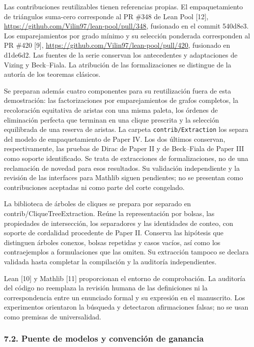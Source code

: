 \documentclass[spanish,11pt,a4paper]{article}
\begin{document}
Las contribuciones reutilizables tienen referencias propias. El empaquetamiento de triángulos suma-cero corresponde al PR \#348 de Lean Pool {[}12{]}, \url{https://github.com/Vilin97/lean-pool/pull/348}, fusionado en el commit {\ttfamily\small 540d8e3}. Los emparejamientos por grado mínimo y su selección ponderada corresponden al PR \#420 {[}9{]}, \url{https://github.com/Vilin97/lean-pool/pull/420}, fusionado en {\ttfamily\small d1de6d2}. Las fuentes de la serie conservan los antecedentes y adaptaciones de Vizing y Beck--Fiala. La atribución de las formalizaciones se distingue de la autoría de los teoremas clásicos.

Se preparan además cuatro componentes para su reutilización fuera de esta demostración: las factorizaciones por emparejamientos de grafos completos, la recoloración equitativa de aristas con una misma paleta, los órdenes de eliminación perfecta que terminan en una clique prescrita y la selección equilibrada de una reserva de aristas. La carpeta \nolinkurl{contrib/Extraction} los separa del modelo de empaquetamiento de Paper IV. Los dos últimos conservan, respectivamente, las pruebas de Dirac de Paper II y de Beck--Fiala de Paper III como soporte identificado. Se trata de extracciones de formalizaciones, no de una reclamación de novedad para esos resultados. Su validación independiente y la revisión de las interfaces para Mathlib siguen pendientes; no se presentan como contribuciones aceptadas ni como parte del corte congelado.

La biblioteca de árboles de cliques se prepara por separado en \mbox{contrib/}\allowbreak\mbox{CliqueTreeExtraction}. Reúne la representación por bolsas, las propiedades de intersección, los separadores y las identidades de conteo, con soporte de cordalidad procedente de Paper II. Conserva las hipótesis que distinguen árboles conexos, bolsas repetidas y casos vacíos, así como los contraejemplos a formulaciones que las omiten. Su extracción tampoco se declara validada hasta completar la compilación y la auditoría independientes.

Lean {[}10{]} y Mathlib {[}11{]} proporcionan el entorno de comprobación. La auditoría del código no reemplaza la revisión humana de las definiciones ni la correspondencia entre un enunciado formal y su expresión en el manuscrito. Los experimentos orientaron la búsqueda y detectaron afirmaciones falsas; no se usan como premisas de universalidad.

\subsubsection{7.2. Puente de modelos y convención de ganancia}\label{puente-de-modelos-y-convencion-de-ganancia}
\end{document}
